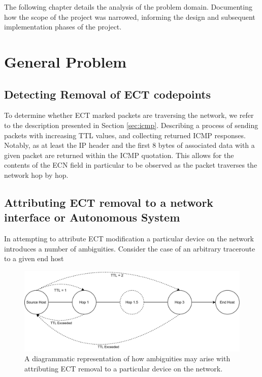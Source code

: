 \documentclass{l4proj}
\begin{document}
The following chapter details the analysis of the problem domain. Documenting how the scope of the project was narrowed, informing the design and subsequent implementation phases of the project.

\section{General Problem}

\subsection{Detecting Removal of ECT codepoints}

To determine whether ECT marked packets are traversing the network, we refer to the description presented in Section \ref{sec:icmp}. Describing a process of sending packets with increasing TTL values, and collecting returned ICMP responses. Notably, as at least the IP header and the first 8 bytes of associated data with a given packet are returned within the ICMP quotation. This allows for the contents of the ECN field in particular to be observed as the packet traverses the network hop by hop.



\subsection{Attributing ECT removal to a network interface or Autonomous System}

In attempting to attribute ECT modification a particular device on the network introduces a number of ambiguities. Consider the case of an arbitrary traceroute to a given end host

\begin{figure}[h!]

\centering
\includegraphics[width=14cm,keepaspectratio]{dissertation/images/ambig_icmp.pdf}
\caption{A diagrammatic representation of how ambiguities may arise with attributing ECT removal to a particular device on the network.}
\label{fig:icmp}
\end{figure}
\end{document}
